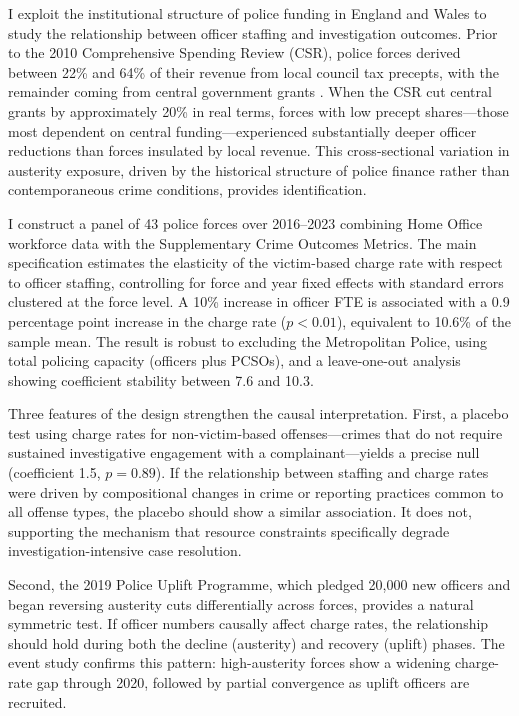 \documentclass[12pt]{article}
\begin{document}
I exploit the institutional structure of police funding in England and Wales to study the relationship between officer staffing and investigation outcomes. Prior to the 2010 Comprehensive Spending Review (CSR), police forces derived between 22\% and 64\% of their revenue from local council tax precepts, with the remainder coming from central government grants \citep{nao2015}. When the CSR cut central grants by approximately 20\% in real terms, forces with low precept shares---those most dependent on central funding---experienced substantially deeper officer reductions than forces insulated by local revenue. This cross-sectional variation in austerity exposure, driven by the historical structure of police finance rather than contemporaneous crime conditions, provides identification.

I construct a panel of 43 police forces over 2016--2023 combining Home Office workforce data with the Supplementary Crime Outcomes Metrics. The main specification estimates the elasticity of the victim-based charge rate with respect to officer staffing, controlling for force and year fixed effects with standard errors clustered at the force level. A 10\% increase in officer FTE is associated with a 0.9 percentage point increase in the charge rate ($p < 0.01$), equivalent to 10.6\% of the sample mean. The result is robust to excluding the Metropolitan Police, using total policing capacity (officers plus PCSOs), and a leave-one-out analysis showing coefficient stability between 7.6 and 10.3.

Three features of the design strengthen the causal interpretation. First, a placebo test using charge rates for non-victim-based offenses---crimes that do not require sustained investigative engagement with a complainant---yields a precise null (coefficient 1.5, $p = 0.89$). If the relationship between staffing and charge rates were driven by compositional changes in crime or reporting practices common to all offense types, the placebo should show a similar association. It does not, supporting the mechanism that resource constraints specifically degrade investigation-intensive case resolution.

Second, the 2019 Police Uplift Programme, which pledged 20,000 new officers and began reversing austerity cuts differentially across forces, provides a natural symmetric test. If officer numbers causally affect charge rates, the relationship should hold during both the decline (austerity) and recovery (uplift) phases. The event study confirms this pattern: high-austerity forces show a widening charge-rate gap through 2020, followed by partial convergence as uplift officers are recruited.
\end{document}
